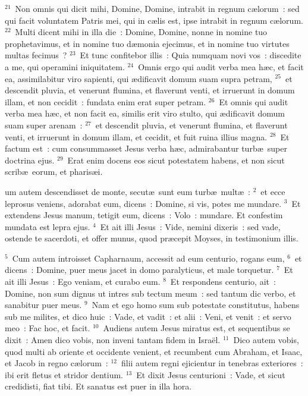 ${}^{21}$~Non omnis qui dicit mihi, Domine, Domine, intrabit in regnum c\ae lorum~: sed qui facit voluntatem Patris mei, qui in c\ae lis est, ipse intrabit in regnum c\ae lorum.
${}^{22}$~Multi dicent mihi in illa die~: Domine, Domine, nonne in nomine tuo prophetavimus, et in nomine tuo d\ae monia ejecimus, et in nomine tuo virtutes multas fecimus~?
${}^{23}$~Et tunc confitebor illis~: Quia numquam novi vos~: discedite a me, qui operamini iniquitatem.
${}^{24}$~Omnis ergo qui audit verba mea h\ae c, et facit ea, assimilabitur viro sapienti, qui \ae dificavit domum suam supra petram,
${}^{25}$~et descendit pluvia, et venerunt flumina, et flaverunt venti, et irruerunt in domum illam, et non cecidit~: fundata enim erat super petram.
${}^{26}$~Et omnis qui audit verba mea h\ae c, et non facit ea, similis erit viro stulto, qui \ae dificavit domum suam super arenam~:
${}^{27}$~et descendit pluvia, et venerunt flumina, et flaverunt venti, et irruerunt in domum illam, et cecidit, et fuit ruina illius magna.
${}^{28}$~Et factum est~: cum consummasset Jesus verba h\ae c, admirabantur turb\ae\ super doctrina ejus.
${}^{29}$~Erat enim docens eos sicut potestatem habens, et non sicut scrib\ae\ eorum, et pharis\ae i.

\bchapter
{}um autem descendisset de monte, secut\ae\ sunt eum turb\ae\ mult\ae~:
${}^{2}$~et ecce leprosus veniens, adorabat eum, dicens~: Domine, si vis, potes me mundare.
${}^{3}$~Et extendens Jesus manum, tetigit eum, dicens~: Volo~: mundare. Et confestim mundata est lepra ejus.
${}^{4}$~Et ait illi Jesus~: Vide, nemini dixeris~: sed vade, ostende te sacerdoti, et offer munus, quod pr\ae cepit Moyses, in testimonium illis.


${}^{5}$~Cum autem introisset Capharnaum, accessit ad eum centurio, rogans eum,
${}^{6}$~et dicens~: Domine, puer meus jacet in domo paralyticus, et male torquetur.
${}^{7}$~Et ait illi Jesus~: Ego veniam, et curabo eum.
${}^{8}$~Et respondens centurio, ait~: Domine, non sum dignus ut intres sub tectum meum~: sed tantum dic verbo, et sanabitur puer meus.
${}^{9}$~Nam et ego homo sum sub potestate constitutus, habens sub me milites, et dico huic~: Vade, et vadit~: et alii~: Veni, et venit~: et servo meo~: Fac hoc, et facit.
${}^{10}$~Audiens autem Jesus miratus est, et sequentibus se dixit~: Amen dico vobis, non inveni tantam fidem in Isra\"el.
${}^{11}$~Dico autem vobis, quod multi ab oriente et occidente venient, et recumbent cum Abraham, et Isaac, et Jacob in regno c\ae lorum~:
${}^{12}$~filii autem regni ejicientur in tenebras exteriores~: ibi erit fletus et stridor dentium.
${}^{13}$~Et dixit Jesus centurioni~: Vade, et sicut credidisti, fiat tibi. Et sanatus est puer in illa hora.


